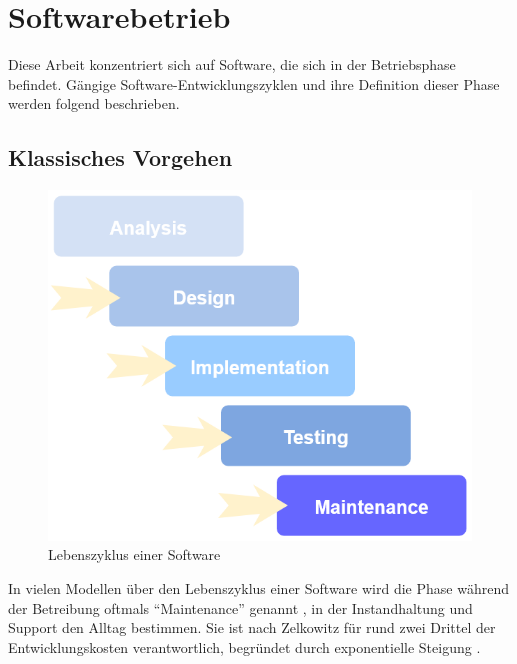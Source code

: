 
\section{Softwarebetrieb}

Diese Arbeit konzentriert sich auf Software, die sich in der Betriebsphase befindet. Gängige Software-Entwicklungszyklen und ihre Definition dieser Phase werden folgend beschrieben.

\subsection{Klassisches Vorgehen}

	\begin{figure}
		\centering
		\vspace{-\baselineskip}
		\includegraphics[width=\linewidth]{img/02_theorie/software-life-cycle.png}
		\caption{Lebenszyklus einer Software}
		\label{fig:software-development-life-cycle}
	\end{figure}
	
	In vielen Modellen über den Lebenszyklus einer Software wird die Phase während der Betreibung oftmals \enquote{Maintenance} genannt \cite{ManagingTheComplexityOfWebSystemsDevelopment} \cite{ASimulationModelWaterfallSoftware}, in der Instandhaltung und Support den Alltag bestimmen. Sie ist nach Zelkowitz \etal \cite{PrinciplesOfSoftwareEngineeringAndDesign} für rund zwei Drittel der Entwicklungskosten verantwortlich, begründet durch exponentielle Steigung \cite{ExtremeProgrammingExplained}.
	
